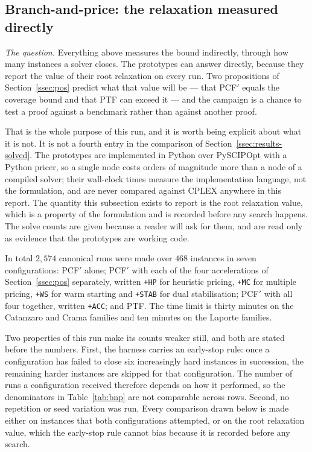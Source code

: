 \subsection{Branch-and-price: the relaxation measured directly}\label{ssec:results-bnp}

\emph{The question.} Everything above measures the bound indirectly, through how many
instances a solver closes. The prototypes can answer directly, because they report the
value of their root relaxation on every run. Two propositions of Section~\ref{ssec:pos}
predict what that value will be --- that PCF$'$ equals the coverage bound and that PTF
can exceed it --- and the campaign is a chance to test a proof against a benchmark
rather than against another proof.

That is the whole purpose of this run, and it is worth being explicit about what it is
not. It is not a fourth entry in the comparison of Section~\ref{ssec:results-solved}.
The prototypes are implemented in Python over PySCIPOpt with a Python pricer, so a
single node costs orders of magnitude more than a node of a compiled solver; their
wall-clock times measure the implementation language, not the formulation, and are
never compared against CPLEX anywhere in this report. The quantity this subsection
exists to report is the root relaxation value, which is a property of the formulation
and is recorded before any search happens. The solve counts are given because a
reader will ask for them, and are read only as evidence that the prototypes are
working code.

In total $2{,}574$ canonical runs were made over $468$ instances in seven
configurations: PCF$'$ alone; PCF$'$ with each of the four accelerations of
Section~\ref{ssec:pos} separately, written \texttt{+HP} for heuristic pricing,
\texttt{+MC} for multiple pricing, \texttt{+WS} for warm starting and \texttt{+STAB}
for dual stabilisation; PCF$'$ with all four together, written \texttt{+ACC}; and PTF.
The time limit is thirty minutes on the Catanzaro and Crama families and ten minutes on
the Laporte families.

Two properties of this run make its counts weaker still, and both are stated before the
numbers. First, the harness carries an early-stop rule: once a configuration has failed
to close six increasingly hard instances in succession, the remaining harder instances
are skipped for that configuration. The number of runs a configuration received
therefore depends on how it performed, so the denominators in Table~\ref{tab:bnp} are
not comparable across rows. Second, no repetition or seed variation was run. Every
comparison drawn below is made either on instances that both configurations attempted,
or on the root relaxation value, which the early-stop rule cannot bias because it is
recorded before any search.


